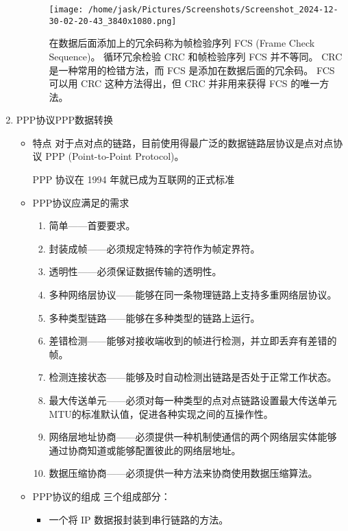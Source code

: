 \documentclass[11pt]{article}
\begin{document}
\begin{enumerate}
\begin{itemize}
\begin{enumerate}
\begin{center}
\texttt{[image: /home/jask/Pictures/Screenshots/Screenshot\_2024-12-30-02-20-43\_3840x1080.png]}
\end{center}

在数据后面添加上的冗余码称为帧检验序列 FCS (Frame Check Sequence)。
循环冗余检验 CRC 和帧检验序列 FCS 并不等同。
CRC 是一种常用的检错方法，而 FCS 是添加在数据后面的冗余码。
FCS 可以用 CRC 这种方法得出，但 CRC 并非用来获得 FCS 的唯一方法。
\end{enumerate}
\end{itemize}
\item PPP协议\hfill{}\textsc{PPP数据转换}
\label{sec:org0b0439d}

\begin{itemize}
\item 特点
对于点对点的链路，目前使用得最广泛的数据链路层协议是点对点协议 PPP (Point-to-Point Protocol)。

PPP 协议在 1994 年就已成为互联网的正式标准

\item PPP协议应满足的需求
\begin{enumerate}
\item 简单——首要要求。

\item 封装成帧——必须规定特殊的字符作为帧定界符。

\item 透明性——必须保证数据传输的透明性。

\item 多种网络层协议——能够在同一条物理链路上支持多重网络层协议。

\item 多种类型链路——能够在多种类型的链路上运行。

\item 差错检测——能够对接收端收到的帧进行检测，并立即丢弃有差错的帧。

\item 检测连接状态——能够及时自动检测出链路是否处于正常工作状态。

\item 最大传送单元——必须对每一种类型的点对点链路设置最大传送单元MTU的标准默认值，促进各种实现之间的互操作性。

\item 网络层地址协商——必须提供一种机制使通信的两个网络层实体能够通过协商知道或能够配置彼此的网络层地址。

\item 数据压缩协商——必须提供一种方法来协商使用数据压缩算法。
\end{enumerate}
\item PPP协议的组成
三个组成部分：
\begin{itemize}
\item 一个将 IP 数据报封装到串行链路的方法。


\end{itemize}
\end{itemize}
\end{enumerate}
\end{document}
